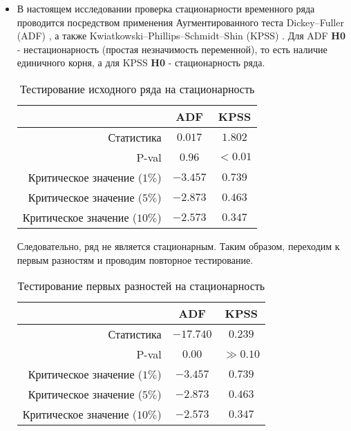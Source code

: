 	\begin{itemize}
		\item В настоящем исследовании проверка стационарности временного ряда проводится посредством применения Аугментированного теста Dickey–Fuller (ADF) \cite{adf_unit_root_test}, а также Kwiatkowski–Phillips–Schmidt–Shin (KPSS) \cite{kpss_unit_root_test}. Для ADF \textbf{H0} - нестационарность (простая незначимость переменной), то есть наличие единичного корня, а для KPSS \textbf{H0} - стационарность ряда.
		\begin{table}[H]
			\centering
			\begin{tabular}{r|cc}
				\toprule
				& ADF & KPSS\\
				\midrule[0.02cm]
				Статистика & $0.017$ & $1.802$\\
				P-val & $0.96$ & $< 0.01$\\
				Критическое значение ($1\%$) & $-3.457$ & $0.739$\\
				Критическое значение ($5\%$) & $-2.873$ & $0.463$\\
				Критическое значение ($10\%$) & $-2.573$ & $0.347$\\
				\midrule[0.02cm]
			\end{tabular}
			\caption{Тестирование исходного ряда на стационарность}
		\end{table}
		Следовательно, ряд не является стационарным. Таким образом, переходим к первым разностям и проводим повторное тестирование.
		\begin{table}[H]
			\centering
			\begin{tabular}{r|cc}
				\toprule
				& ADF & KPSS\\
				\midrule[0.02cm]
				Статистика & $-17.740$ & $0.239$\\
				P-val & $0.00$ & $\gg 0.10$\\
				Критическое значение ($1\%$) & $-3.457$ & $0.739$\\
				Критическое значение ($5\%$) & $-2.873$ & $0.463$\\
				Критическое значение ($10\%$) & $-2.573$ & $0.347$\\
				\midrule[0.02cm]
			\end{tabular}
			\caption{Тестирование первых разностей на стационарность}
		\end{table}
	

\end{itemize}
